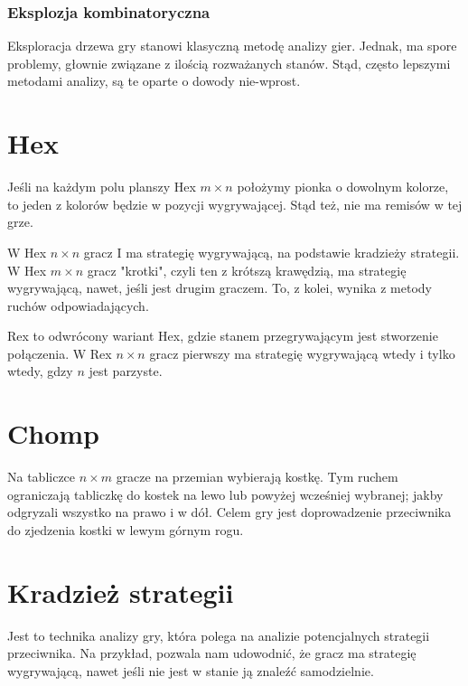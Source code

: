 \documentclass{../notatki}
\begin{document}
\subsubsection{Eksplozja kombinatoryczna}

Eksploracja drzewa gry stanowi klasyczną metodę analizy gier. Jednak, ma spore
problemy, głownie związane z ilością rozważanych stanów. Stąd, często lepszymi
metodami analizy, są te oparte o dowody nie-wprost.

\section{Hex}

Jeśli na każdym polu planszy Hex $m \times n$ położymy pionka o
dowolnym kolorze, to jeden z kolorów będzie w pozycji wygrywającej. Stąd też,
nie ma remisów w tej grze.

W Hex $n \times n$ gracz I ma strategię wygrywającą, na podstawie kradzieży
strategii. W Hex $m \times n$ gracz "krotki", czyli ten z krótszą krawędzią,
ma strategię wygrywającą, nawet, jeśli jest drugim graczem. To, z kolei,
wynika z metody ruchów odpowiadających.

Rex to odwrócony wariant Hex, gdzie stanem przegrywającym jest stworzenie
połączenia. W Rex $n \times n$ gracz pierwszy ma strategię wygrywającą wtedy
i tylko wtedy, gdzy $n$ jest parzyste.

\section{Chomp}

Na tabliczce $n \times m$ gracze na przemian wybierają kostkę. Tym ruchem
ograniczają tabliczkę do kostek na lewo lub powyżej wcześniej wybranej;
jakby odgryzali wszystko na prawo i w dół. Celem gry jest doprowadzenie
przeciwnika do zjedzenia kostki w lewym górnym rogu.

\section{Kradzież strategii}

Jest to technika analizy gry, która polega na analizie potencjalnych strategii
przeciwnika. Na przykład, pozwala nam udowodnić, że gracz ma strategię
wygrywającą, nawet jeśli nie jest w stanie ją znaleźć samodzielnie.
\end{document}
